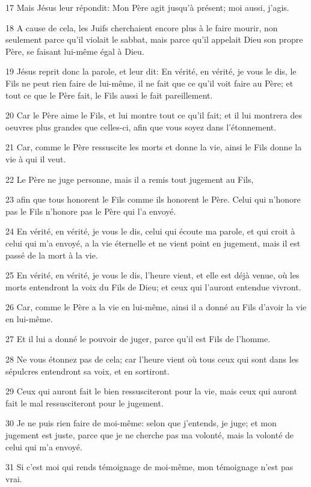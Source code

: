 \par 17 Mais Jésus leur répondit: Mon Père agit jusqu'à présent; moi aussi, j'agis.
\par 18 A cause de cela, les Juifs cherchaient encore plus à le faire mourir, non seulement parce qu'il violait le sabbat, mais parce qu'il appelait Dieu son propre Père, se faisant lui-même égal à Dieu.
\par 19 Jésus reprit donc la parole, et leur dit: En vérité, en vérité, je vous le dis, le Fils ne peut rien faire de lui-même, il ne fait que ce qu'il voit faire au Père; et tout ce que le Père fait, le Fils aussi le fait pareillement.
\par 20 Car le Père aime le Fils, et lui montre tout ce qu'il fait; et il lui montrera des oeuvres plus grandes que celles-ci, afin que vous soyez dans l'étonnement.
\par 21 Car, comme le Père ressuscite les morts et donne la vie, ainsi le Fils donne la vie à qui il veut.
\par 22 Le Père ne juge personne, mais il a remis tout jugement au Fils,
\par 23 afin que tous honorent le Fils comme ils honorent le Père. Celui qui n'honore pas le Fils n'honore pas le Père qui l'a envoyé.
\par 24 En vérité, en vérité, je vous le dis, celui qui écoute ma parole, et qui croit à celui qui m'a envoyé, a la vie éternelle et ne vient point en jugement, mais il est passé de la mort à la vie.
\par 25 En vérité, en vérité, je vous le dis, l'heure vient, et elle est déjà venue, où les morts entendront la voix du Fils de Dieu; et ceux qui l'auront entendue vivront.
\par 26 Car, comme le Père a la vie en lui-même, ainsi il a donné au Fils d'avoir la vie en lui-même.
\par 27 Et il lui a donné le pouvoir de juger, parce qu'il est Fils de l'homme.
\par 28 Ne vous étonnez pas de cela; car l'heure vient où tous ceux qui sont dans les sépulcres entendront sa voix, et en sortiront.
\par 29 Ceux qui auront fait le bien ressusciteront pour la vie, mais ceux qui auront fait le mal ressusciteront pour le jugement.
\par 30 Je ne puis rien faire de moi-même: selon que j'entends, je juge; et mon jugement est juste, parce que je ne cherche pas ma volonté, mais la volonté de celui qui m'a envoyé.
\par 31 Si c'est moi qui rends témoignage de moi-même, mon témoignage n'est pas vrai.
